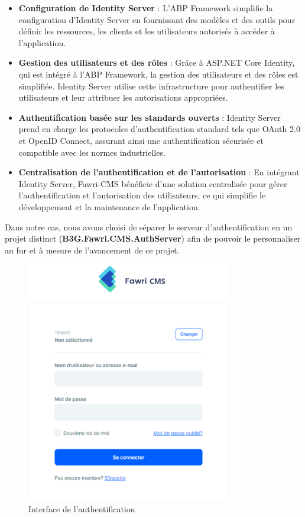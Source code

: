 \begin{itemize}
    \item \textbf{Configuration de Identity Server} : L'ABP Framework simplifie la configuration d'Identity Server en fournissant des modèles et des outils pour définir les ressources, les clients et les utilisateurs autorisés à accéder à l'application.

    \item \textbf{Gestion des utilisateurs et des rôles} : Grâce à ASP.NET Core Identity, qui est intégré à l'ABP Framework, la gestion des utilisateurs et des rôles est simplifiée. Identity Server utilise cette infrastructure pour authentifier les utilisateurs et leur attribuer les autorisations appropriées.

    \item \textbf{Authentification basée sur les standards ouverts} : Identity Server prend en charge les protocoles d'authentification standard tels que OAuth 2.0 et OpenID Connect, assurant ainsi une authentification sécurisée et compatible avec les normes industrielles.

    \item \textbf{Centralisation de l'authentification et de l'autorisation} : En intégrant Identity Server, Fawri-CMS bénéficie d'une solution centralisée pour gérer l'authentification et l'autorisation des utilisateurs, ce qui simplifie le développement et la maintenance de l'application.
\end{itemize}

Dans notre cas, nous avons choisi de séparer le serveur d'authentification en un projet distinct (\textbf{B3G.Fawri.CMS.AuthServer}) afin de pouvoir le personnaliser au fur et à mesure de l'avancement de ce projet.


\begin{figure}[H]
    \centering
    \includegraphics[width=9cm]{Figures/login ui.PNG}
    \caption{Interface de l'authentification}
\end{figure}



